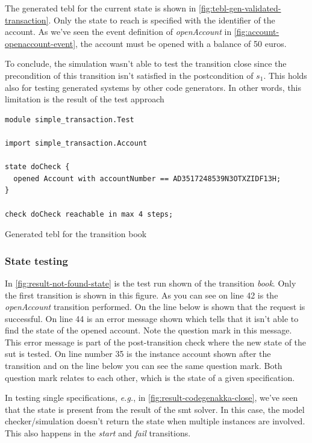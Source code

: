 The generated tebl for the current state is shown in
\autoref{fig:tebl-gen-validated-transaction}. Only the state to reach is
specified with the identifier of the account. As we've seen the event definition
of \textit{openAccount} in \autoref{fig:account-openaccount-event}, the account
must be opened with a balance of 50 euros.

To conclude, the simulation wasn't able to test the transition close since the
precondition of this transition isn't satisfied in the postcondition of $s_{1}$.
This holds also for testing generated systems by other code generators. In other
words, this limitation is the result of the test approach

\begin{sourcecode}[h!]
\begin{lstlisting}[]
module simple_transaction.Test

import simple_transaction.Account

state doCheck {
  opened Account with accountNumber == AD3517248539N3OTXZIDF13H;
}

check doCheck reachable in max 4 steps;
\end{lstlisting}
\caption{Generated tebl for the transition book}\label{fig:tebl-gen-validated-transaction}
\end{sourcecode}
\FloatBarrier

\subsubsection{State testing}

In \autoref{fig:result-not-found-state} is the test run shown of the transition
\textit{book}. Only the first transition is shown in this figure. As you can
see on line 42 is the \textit{openAccount} transition performed. On the line
below is shown that the request is successful. On line 44 is an error message
shown which tells that it isn't able to find the state of the opened account.
Note the question mark in this message. This error message is part of the
post-transition check where the new state of the \gls{sut} is tested. On line number
35 is the instance account shown after the transition and on the line below you
can see the same question mark. Both question mark relates to each other, which
is the state of a given specification.

In testing single specifications, \textit{e.g.}, in
\autoref{fig:result-codegenakka-close}, we've seen that the state is present
from the result of the \gls{smt} solver. In this case, the model checker/simulation
doesn't return the state when multiple instances are involved. This also
happens in the \textit{start} and \textit{fail} transitions.

